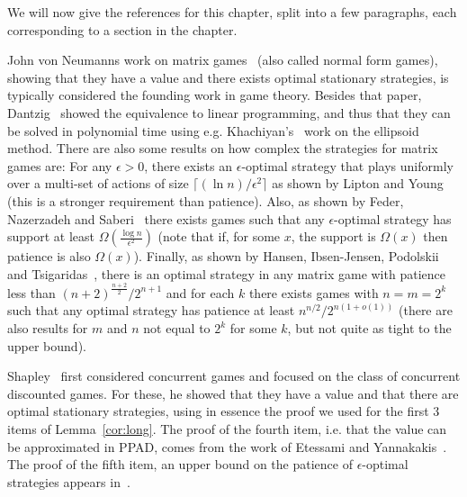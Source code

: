 We will now give the references for this chapter, split into a few paragraphs, each corresponding to a section in the chapter.

John von Neumanns work on matrix games~\cite{vonNeumann&Morgenstern:1944} (also called normal form games), showing that they have a value and there exists optimal stationary strategies, is typically considered the founding work in game theory. Besides that paper, Dantzig~\cite{Dantzig:1965} showed the equivalence to linear programming, and thus that they can be solved in polynomial time using e.g. Khachiyan's~\cite{Kha:1979} work on the ellipsoid method.
There are also some results on how complex the strategies for matrix games are: For any $\epsilon>0$, there exists an $\epsilon$-optimal strategy that plays uniformly over a multi-set of actions of size $\lceil (\ln n)/\epsilon^2\rceil$ as shown by Lipton and Young~\cite{Lipton&Young:1994} (this is a stronger requirement than patience).
Also, as shown by Feder, Nazerzadeh and Saberi~\cite{FNS:2007} there exists games such that any $\epsilon$-optimal strategy has support at least $\Omega(\frac{\log n}{\epsilon^2})$ (note that if, for some $x$, the support is $\Omega(x)$ then patience is also $\Omega(x)$).
Finally,  as shown by Hansen, Ibsen-Jensen, Podolskii and Tsigaridas~\cite{HIPT:2013}, there is an optimal strategy in any matrix game with patience less than $(n+2)^{\frac{n+2}{2}}/2^{n+1}$ and for each $k$ there exists games with $n=m=2^k$ such that any optimal strategy has patience at least $n^{n/2}/2^{n(1+o(1))}$ (there are also results for $m$ and $n$ not equal to $2^k$ for some $k$, but not quite as tight to the upper bound).

Shapley~\cite{Sha:1953} first considered concurrent games and focused on the class of concurrent discounted games. For these, he showed that they have a value and that there are optimal stationary strategies, using in essence the proof we used for the first 3 items of Lemma~\ref{cor:long}.
The proof of the fourth item, i.e. that the value can be approximated in PPAD, comes from the work of Etessami  and Yannakakis~\cite{EY:2007}. The proof of the fifth item, an upper bound on the patience of $\epsilon$-optimal strategies appears in~\cite{ibsenjensen:2012}.

